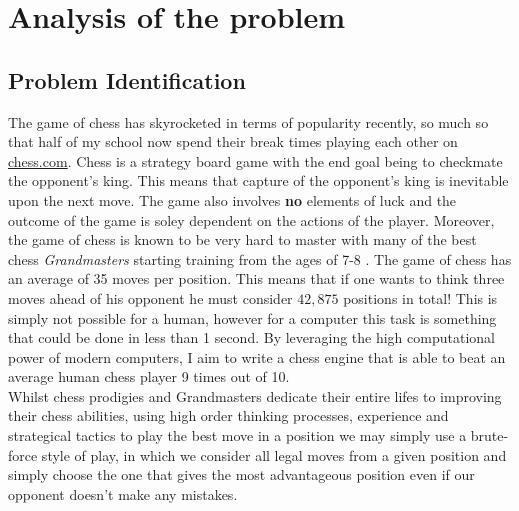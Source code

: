 \pagestyle{fancy}

\chapter{Analysis of the problem}

\section{Problem Identification}
The game of chess has skyrocketed in terms of popularity
recently, so much so that half of my school now spend their
break times playing each other on \url{chess.com}. Chess 
is a strategy board game with the end goal being to checkmate
the opponent's king. \cite{rules} This means that capture of 
the opponent's king is inevitable upon the next move. The 
game also involves \textbf{no} elements of luck and the 
outcome of the game is soley dependent on the actions of the
player. Moreover, the game of chess is known to be very
hard to master with many of the best chess
\textit{Grandmasters} starting training from the
ages of 7-8 \cite{Magnus}. The game of chess has an average
of 35 moves \cite{branch} per position. This means that 
if one wants to think three moves ahead of his opponent
he must consider $42,875$ positions in total! This is
simply not possible for a human, however for a computer
this task is something that could be done in less than
1 second. By leveraging the high computational power
of modern computers, I aim to write a chess engine that
is able to beat an average human chess player 9 times
out of 10.\\

Whilst chess prodigies and Grandmasters dedicate their entire
lifes to improving their chess abilities, using high order 
thinking processes, experience and strategical tactics to play
the best move in a position we may simply use a brute-force 
style of play, in which we consider all legal moves from a 
given position and simply choose the one that gives the most
advantageous position even if our opponent doesn't make any 
mistakes.

